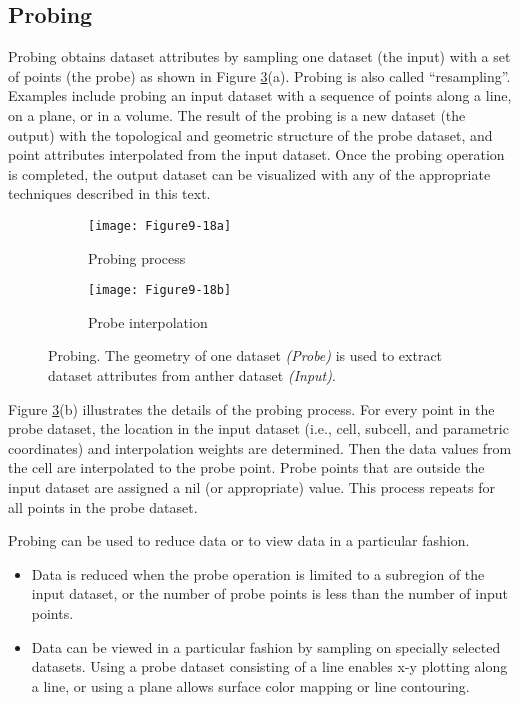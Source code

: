 \subsection{Probing}
\label{subsec:probing}

Probing obtains dataset attributes by sampling one dataset (the input) with a set of points (the probe) as shown in Figure \ref{fig:Figure9-18}(a). Probing is also called ``resampling''. Examples include probing an input dataset with a sequence of points along a line, on a plane, or in a volume. The result of the probing is a new dataset (the output) with the topological and geometric structure of the probe dataset, and point attributes interpolated from the input dataset. Once the probing operation is completed, the output dataset can be visualized with any of the appropriate techniques described in this text.

\begin{figure}[htb]
	\begin{subfigure}[h]{0.48\linewidth}
		\texttt{[image: Figure9-18a]}
		\captionsetup{justification=centering}
		\caption{Probing process}
		\label{fig:Figure9-18a}
	\end{subfigure}
	\hfill
	\begin{subfigure}[h]{0.48\linewidth}
		\texttt{[image: Figure9-18b]}
		\captionsetup{justification=centering}
		\caption{Probe interpolation}
		\label{fig:Figure9-18b}
	\end{subfigure}
	\caption{Probing. The geometry of one dataset \textit{(Probe)} is used to extract dataset attributes from anther dataset \textit{(Input)}.}\label{fig:Figure9-18}
\end{figure}

Figure \ref{fig:Figure9-18}(b) illustrates the details of the probing process. For every point in the probe dataset, the location in the input dataset (i.e., cell, subcell, and parametric coordinates) and interpolation weights are determined. Then the data values from the cell are interpolated to the probe point. Probe points that are outside the input dataset are assigned a nil (or appropriate) value. This process repeats for all points in the probe dataset.

Probing can be used to reduce data or to view data in a particular fashion.

\begin{itemize}

\item Data is reduced when the probe operation is limited to a subregion of the input dataset, or the number of probe points is less than the number of input points.

\item Data can be viewed in a particular fashion by sampling on specially selected datasets. Using a probe dataset consisting of a line enables x-y plotting along a line, or using a plane allows surface color mapping or line contouring.

\end{itemize}

